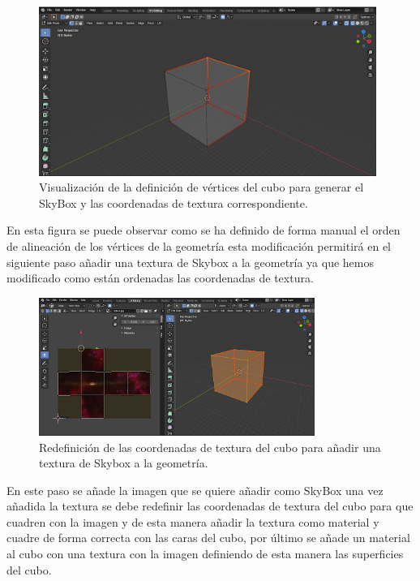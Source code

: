 \documentclass[a4paper]{book}
\begin{document}
\begin{figure}[H]
    \centering
    \includegraphics[width=11cm, keepaspectratio]{img/SkyBoxBlender.png}
    \caption{Visualización de la definición de vértices del cubo para generar el SkyBox y las coordenadas de textura correspondiente.}
    \label{SkyBoxBlender}
\end{figure}

En esta figura se puede observar como se ha definido de forma manual el orden de alineación de los vértices de la geometría esta
modificación permitirá en el siguiente paso añadir una textura de Skybox a la geometría ya que hemos modificado como están
ordenadas las coordenadas de textura.

\begin{figure}[H]
    \centering
    \includegraphics[width=9cm, keepaspectratio]{img/SkyBoxVertex.png}
    \caption{Redefinición de las coordenadas de textura del cubo para añadir una textura de Skybox a la geometría.}
    \label{SkyBoxVertex}
\end{figure}

En este paso se añade la imagen que se quiere añadir como SkyBox una vez añadida la textura se debe redefinir las coordenadas
de textura del cubo para que cuadren con la imagen y de esta manera añadir la textura como material y cuadre de forma correcta
con las caras del cubo, por último se añade un material al cubo con una textura con la imagen definiendo de esta manera las
superficies del cubo.
\end{document}
